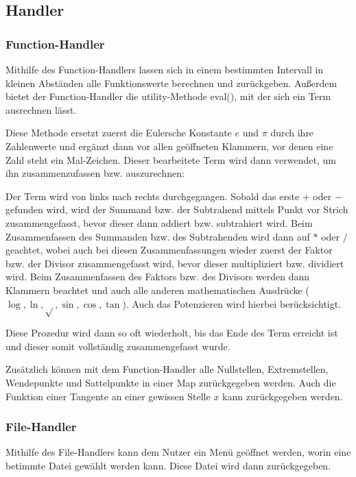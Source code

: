 \documentclass[12pt,a4paper]{article}
\begin{document}
    \subsection{Handler}

    \subsubsection{Function-Handler}
    Mithilfe des Function-Handlers lassen sich in einem bestimmten Intervall in kleinen Abständen alle
    Funktionswerte berechnen und zurückgeben.
    Außerdem bietet der Function-Handler die utility-Methode eval(), mit der sich ein Term ausrechnen lässt.\par
    Diese Methode ersetzt zuerst die Eulersche Konstante $e$ und $\pi$ durch ihre Zahlenwerte und ergänzt dann vor allen
    geöffneten Klammern, vor denen eine Zahl steht ein Mal-Zeichen.
    Dieser bearbeitete Term wird dann verwendet, um ihn zusammenzufassen bzw. auszurechnen:\par
    \begingroup
    \leftskip=7mm
    \vspace{2mm}
    Der Term wird von links nach rechts durchgegangen.
    Sobald das erste $+$ oder $-$ gefunden wird, wird der Summand bzw. der Subtrahend mittels Punkt vor Strich
    zusammengefasst, bevor dieser dann addiert bzw. subtrahiert wird.
    Beim Zusammenfassen des Summanden bzw. des Subtrahenden wird dann auf $*$ oder $/$ geachtet, wobei auch bei diesen
    Zusammenfassungen wieder zuerst der Faktor bzw. der Divisor zusammengefasst wird, bevor dieser multipliziert
    bzw. dividiert wird.
    Beim Zusammenfassen des Faktors bzw. des Divisors werden dann Klammern beachtet und auch alle anderen mathematischen
    Ausdrücke ($\log, \ln, \sqrt {}, \sin, \cos, \tan$). Auch das Potenzieren wird hierbei berücksichtigt.\par
    \vspace{4mm}
    Diese Prozedur wird dann so oft wiederholt, bis das Ende des Term erreicht ist und dieser somit vollständig
    zusammengefasst wurde.\par
    \vspace{2mm}
    \endgroup
    Zusätzlich können mit dem Function-Handler alle Nullstellen, Extremstellen, Wendepunkte und Sattelpunkte
    in einer Map zurückgegeben werden.
    Auch die Funktion einer Tangente an einer gewissen Stelle $x$ kann zurückgegeben werden.

    \subsubsection{File-Handler}
    Mithilfe des File-Handlers kann dem Nutzer ein Menü geöffnet werden, worin eine betimmte Datei gewählt werden kann.
    Diese Datei wird dann zurückgegeben.
\end{document}
